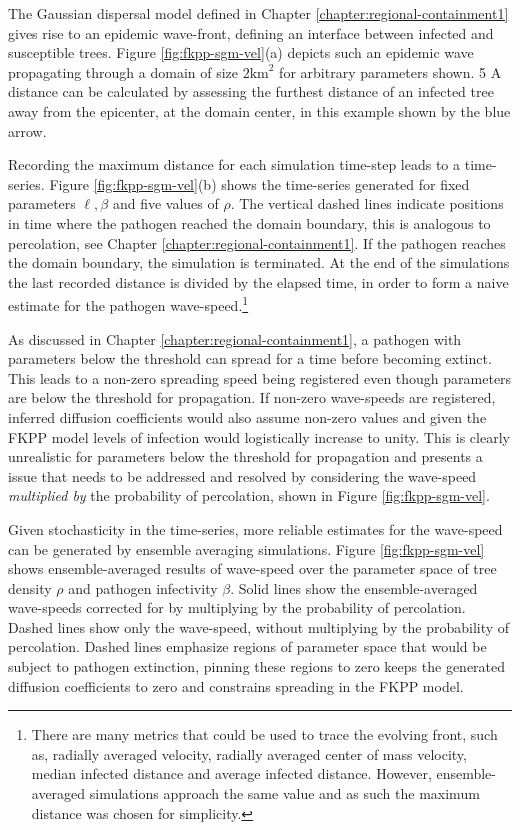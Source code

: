 The Gaussian dispersal model defined in Chapter \ref{chapter:regional-containment1} gives rise to an epidemic wave-front, defining an interface between infected and susceptible trees. %
Figure \ref{fig:fkpp-sgm-vel}(a) depicts such an epidemic wave propagating through a domain of size $2\mathrm{km}^2$ for arbitrary parameters shown. 5
A distance can be calculated by assessing the furthest distance of an infected tree away from the epicenter, at the domain center, in this example shown by the blue arrow. %

Recording the maximum distance for each simulation time-step leads to a time-series. %
Figure \ref{fig:fkpp-sgm-vel}(b) shows the time-series generated for fixed parameters $\ell, \beta$ and five values of $\rho$. %
The vertical dashed lines indicate positions in time where the pathogen reached the domain boundary, this is analogous to percolation, see Chapter \ref{chapter:regional-containment1}. %
If the pathogen reaches the domain boundary, the  simulation is terminated. %
At the end of the simulations the last recorded distance is divided by the elapsed time, in order to form a naive estimate for the pathogen wave-speed.\footnote{There are many metrics that could be used to trace the evolving front, such as, radially averaged velocity, radially averaged center of mass velocity, median infected distance and average infected distance. However, ensemble-averaged simulations approach the same value and as such the maximum distance was chosen for simplicity.} %

As discussed in Chapter \ref{chapter:regional-containment1}, a pathogen with parameters below the threshold can spread for a time before becoming extinct. This leads to a non-zero spreading speed being registered even though parameters are below the threshold for propagation. %
If non-zero wave-speeds are registered, inferred diffusion coefficients would also assume non-zero values and given the FKPP model levels of infection would logistically increase to unity. %
This is clearly unrealistic for parameters below the threshold for propagation and presents a issue that needs to be addressed and  resolved by considering the wave-speed \textit{multiplied by} the probability of percolation, shown in Figure \ref{fig:fkpp-sgm-vel}. %

Given stochasticity in the time-series, more reliable estimates for the wave-speed can be generated by ensemble averaging simulations. %
Figure \ref{fig:fkpp-sgm-vel} shows ensemble-averaged results of wave-speed over the parameter space of tree density $\rho$ and pathogen infectivity $\beta$. %
Solid lines show the ensemble-averaged wave-speeds corrected for by multiplying by the probability of percolation. %
Dashed lines show only the wave-speed, without multiplying by the probability of percolation. Dashed lines emphasize regions of parameter space that would be subject to pathogen extinction, pinning these regions to zero keeps the generated diffusion coefficients to zero and constrains spreading in the FKPP model.

